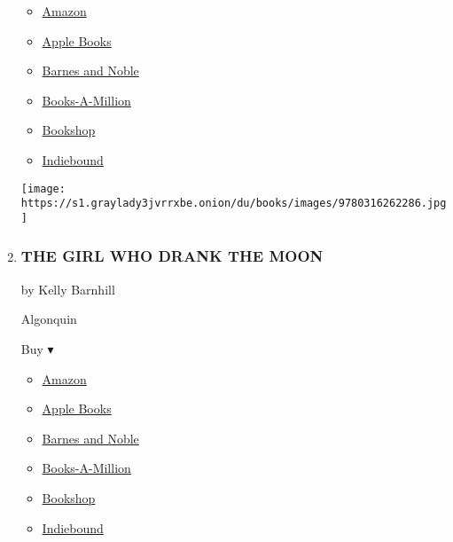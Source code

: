 \begin{enumerate}
  \begin{itemize}
  \tightlist
  \item
    \href{https://www.amazon.com/Ghost-Boys-Jewell-Parker-Rhodes/dp/0316262285?tag=NYTBS-20}{Amazon}
  \item
    \href{https://du-gae-books-dot-nyt-du-prd.appspot.com/buy?title=GHOST+BOYS\&author=Jewell+Parker+Rhodes}{Apple
    Books}
  \item
    \href{https://www.anrdoezrs.net/click-7990613-11819508?url=https\%3A\%2F\%2Fwww.barnesandnoble.com\%2Fw\%2F\%3Fean\%3D9780316262262}{Barnes
    and Noble}
  \item
    \href{https://www.anrdoezrs.net/click-7990613-35140?url=https\%3A\%2F\%2Fwww.booksamillion.com\%2Fp\%2FGHOST\%2BBOYS\%2FJewell\%2BParker\%2BRhodes\%2F9780316262262}{Books-A-Million}
  \item
    \href{https://bookshop.org/a/3546/9780316262262}{Bookshop}
  \item
    \href{https://www.indiebound.org/book/9780316262262?aff=NYT}{Indiebound}
  \end{itemize}

  \texttt{[image: https://s1.graylady3jvrrxbe.onion/du/books/images/9780316262286.jpg]}
\item
  \href{https://www.nytimes3xbfgragh.onion/2016/10/09/books/review/girl-who-drank-the-moon-kelly-barnhill.html}{}

  \hypertarget{the-girl-who-drank-the-moon}{%
  \subsubsection{THE GIRL WHO DRANK THE
  MOON}\label{the-girl-who-drank-the-moon}}

  by Kelly Barnhill

  Algonquin

  Buy ▾

  \begin{itemize}
  \tightlist
  \item
    \href{https://www.amazon.com/Girl-Who-Drank-Moon/dp/1616205679?tag=NYTBS-20}{Amazon}
  \item
    \href{https://du-gae-books-dot-nyt-du-prd.appspot.com/buy?title=THE+GIRL+WHO+DRANK+THE+MOON\&author=Kelly+Barnhill}{Apple
    Books}
  \item
    \href{https://www.anrdoezrs.net/click-7990613-11819508?url=https\%3A\%2F\%2Fwww.barnesandnoble.com\%2Fw\%2F\%3Fean\%3D9781616207465}{Barnes
    and Noble}
  \item
    \href{https://www.anrdoezrs.net/click-7990613-35140?url=https\%3A\%2F\%2Fwww.booksamillion.com\%2Fp\%2FTHE\%2BGIRL\%2BWHO\%2BDRANK\%2BTHE\%2BMOON\%2FKelly\%2BBarnhill\%2F9781616207465}{Books-A-Million}
  \item
    \href{https://bookshop.org/a/3546/9781616207465}{Bookshop}
  \item
    \href{https://www.indiebound.org/book/9781616207465?aff=NYT}{Indiebound}
  \end{itemize}


\end{enumerate}
